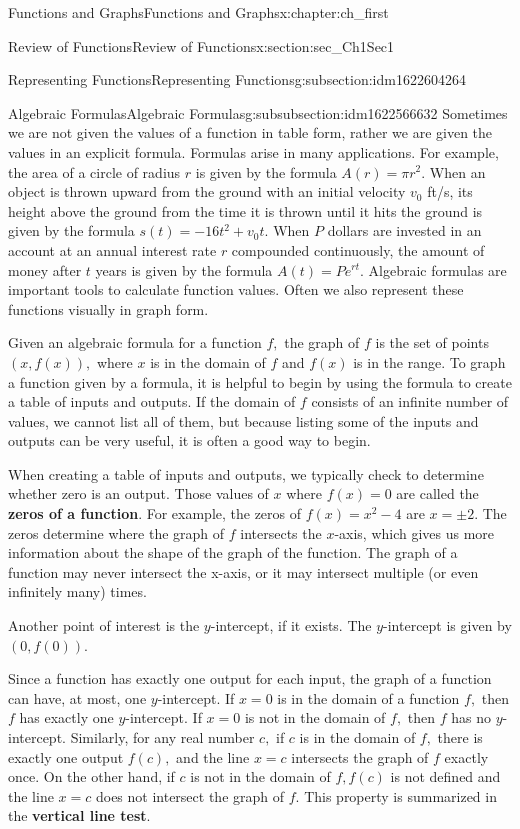 \documentclass[oneside,10pt,]{book}
\newcommand{\terminology}[1]{\textbf{#1}}
\numberwithin{equation}{section}
\begin{document}
\begin{chapterptx}{Functions and Graphs}{}{Functions and Graphs}{}{}{x:chapter:ch_first}
\begin{sectionptx}{Review of Functions}{}{Review of Functions}{}{}{x:section:sec_Ch1Sec1}
\begin{subsectionptx}{Representing Functions}{}{Representing Functions}{}{}{g:subsection:idm1622604264}
\begin{subsubsectionptx}{Algebraic Formulas}{}{Algebraic Formulas}{}{}{g:subsubsection:idm1622566632}
Sometimes we are not given the values of a function in table form, rather we are given the values in an explicit formula. Formulas arise in many applications. For example, the area of a circle of radius \(r\) is given by the formula \(A(r)=\pi r^2.\) When an object is thrown upward from the ground with an initial velocity \(v_0\) ft\slash{}s, its height above the ground from the time it is thrown until it hits the ground is given by the formula \(s(t)=-16t^2+v_0 t.\) When \(P\) dollars are invested in an account at an annual interest rate \(r\) compounded continuously, the amount of money after \(t\) years is given by the formula \(A(t)=Pe^{rt}.\) Algebraic formulas are important tools to calculate function values. Often we also represent these functions visually in graph form.%
\par
Given an algebraic formula for a function \(f,\) the graph of \(f\) is the set of points \((x,f(x)),\) where \(x\) is in the domain of \(f\) and \(f(x)\) is in the range. To graph a function given by a formula, it is helpful to begin by using the formula to create a table of inputs and outputs. If the domain of \(f\) consists of an infinite number of values, we cannot list all of them, but because listing some of the inputs and outputs can be very useful, it is often a good way to begin.%
\par
When creating a table of inputs and outputs, we typically check to determine whether zero is an output. Those values of \(x\) where \(f(x)=0\) are called the \terminology{zeros of a function}. For example, the zeros of \(f(x)=x^2-4\) are \(x=±2.\) The zeros determine where the graph of \(f\) intersects the \(x\)-axis, which gives us more information about the shape of the graph of the function. The graph of a function may never intersect the x-axis, or it may intersect multiple (or even infinitely many) times.%
\par
Another point of interest is the \(y\)-intercept, if it exists. The \(y\)-intercept is given by \((0,f(0)).\)%
\par
Since a function has exactly one output for each input, the graph of a function can have, at most, one \(y\)-intercept. If \(x=0\) is in the domain of a function \(f,\) then \(f\) has exactly one \(y\)-intercept. If \(x=0\) is not in the domain of \(f,\) then \(f\) has no \(y\)-intercept. Similarly, for any real number \(c,\) if \(c\) is in the domain of \(f,\) there is exactly one output \(f(c),\) and the line \(x=c\) intersects the graph of \(f\) exactly once. On the other hand, if \(c\) is not in the domain of \(f,f(c)\) is not defined and the line \(x=c\) does not intersect the graph of \(f.\) This property is summarized in the \terminology{vertical line test}.%

\end{subsubsectionptx}
\end{subsectionptx}
\end{sectionptx}
\end{chapterptx}
\end{document}
